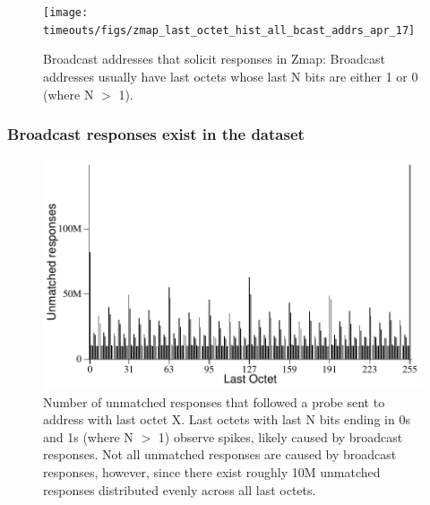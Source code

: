 \begin{figure}[tb]
\begin{center}
\texttt{[image: timeouts/figs/zmap\_last\_octet\_hist\_all\_bcast\_addrs\_apr\_17]}
\end{center}
\caption{\label{fig:zmap_last_octet_hist}%
Broadcast addresses that solicit responses in Zmap: Broadcast addresses usually
have last octets whose last N bits are either 1 or 0
(where N $>$ 1).
}
\end{figure}


\subsubsection*{Broadcast responses exist in the dataset}

%
\begin{figure}[tb]
\begin{center}
\includegraphics[width=.99\linewidth]{timeouts/figs/last_octet_hist}
\end{center}
\caption{\label{fig:bcast_hist}%
Number of unmatched responses that followed a probe sent to address
with last octet X. Last octets with last N bits ending in
0s and 1s (where N $>$ 1) observe spikes, likely caused by broadcast
responses. Not all unmatched responses are caused by broadcast
responses, however, since there exist roughly 10M unmatched
responses distributed evenly across all last octets.}
\end{figure}



